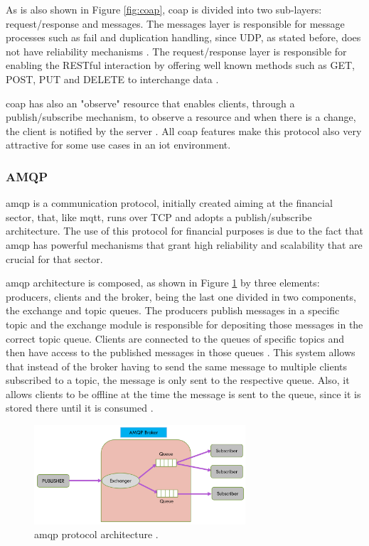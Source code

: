 As is also shown in Figure \ref{fig:coap}, \ac{coap} is divided into two sub-layers: request/response and messages. The messages layer is responsible for message processes such as fail and duplication handling, since UDP, as stated before, does not have reliability mechanisms \cite{Salman2013}. The request/response layer is responsible for enabling the RESTful interaction by offering well known methods such as GET, POST, PUT and DELETE to interchange data \cite{Lerche2012}.

\ac{coap} has also an "observe" resource that enables clients, through a publish/subscribe mechanism, to observe a resource and when there is a change, the client is notified by the server \cite{Lerche2012}. All \ac{coap} features make this protocol also very attractive for some use cases in an \ac{iot} environment.


\subsubsection{AMQP}

\acf{amqp} is a communication protocol, initially created aiming at the financial sector, that, like \ac{mqtt}, runs over TCP and adopts a publish/subscribe architecture. The use of this protocol for financial purposes is due to the fact that \ac{amqp} has powerful mechanisms that grant high reliability and scalability that are crucial for that sector.

\ac{amqp} architecture is composed, as shown in Figure \ref{fig:amqp} by three elements: producers, clients and the broker, being the last one divided in two components, the exchange and topic queues. The producers publish messages in a specific topic and the exchange module is responsible for depositing those messages in the correct topic queue. Clients are connected to the queues of specific topics and then have access to the published messages in those queues \cite{Salman2013}. This system allows that instead of the broker having to send the same message to multiple clients subscribed to a topic, the message is only sent to the respective queue. Also, it allows clients to be offline at the time the message is sent to the queue, since it is stored there until it is consumed \cite{Al-fuqaha2015}.

\begin{figure}[H]
	\centering
	\includegraphics[width=0.7\textwidth]{figures/amqp.png}
	\caption{\ac{amqp} protocol architecture \cite{Badugu}.}
	\label{fig:amqp}
\end{figure}

